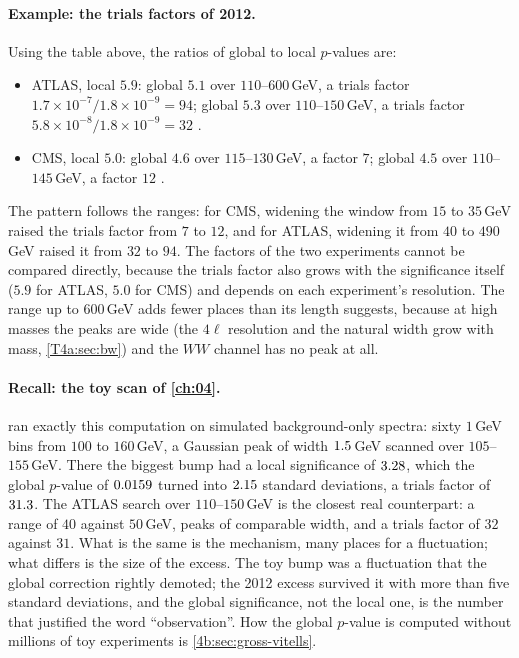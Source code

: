 \paragraph{Example: the trials factors of 2012.}
Using the table above, the ratios of global to local $p$-values are:
\begin{itemize}[itemsep=1pt,leftmargin=1.2em]
  \item ATLAS, local $5.9$: global $5.1$ over $110$--$600$\,GeV, a trials factor $1.7\times10^{-7}/1.8\times10^{-9}=94$; global $5.3$ over $110$--$150$\,GeV, a trials factor $5.8\times10^{-8}/1.8\times10^{-9}=32$ \cite[Sec.~9.2]{AadHiggs2012}.
  \item CMS, local $5.0$: global $4.6$ over $115$--$130$\,GeV, a factor $7$; global $4.5$ over $110$--$145$\,GeV, a factor $12$ \cite[Sec.~7.1]{ChatrchyanHiggs2012}.
\end{itemize}
The pattern follows the ranges: for CMS, widening the window from $15$ to $35$\,GeV raised the trials factor from $7$ to $12$, and for ATLAS, widening it from $40$ to $490$\,GeV raised it from $32$ to $94$. The factors of the two experiments cannot be compared directly, because the trials factor also grows with the significance itself ($5.9$ for ATLAS, $5.0$ for CMS) and depends on each experiment's resolution. The range up to $600$\,GeV adds fewer places than its length suggests, because at high masses the peaks are wide (the $4\ell$ resolution and the natural width grow with mass, \cref{T4a:sec:bw}) and the $WW$ channel has no peak at all.

\paragraph{Recall: the toy scan of \cref{ch:04}.}
 ran exactly this computation on simulated background-only spectra: sixty $1$\,GeV bins from $100$ to $160$\,GeV, a Gaussian peak of width $1.5$\,GeV scanned over $105$--$155$\,GeV. There the biggest bump had a local significance of $3.28$, which the global $p$-value of $0.0159$ turned into $2.15$ standard deviations, a trials factor of $31.3$. The ATLAS search over $110$--$150$\,GeV is the closest real counterpart: a range of $40$ against $50$\,GeV, peaks of comparable width, and a trials factor of $32$ against $31$. What is the same is the mechanism, many places for a fluctuation; what differs is the size of the excess. The toy bump was a fluctuation that the global correction rightly demoted; the 2012 excess survived it with more than five standard deviations, and the global significance, not the local one, is the number that justified the word ``observation''. How the global $p$-value is computed without millions of toy experiments is \cref{4b:sec:gross-vitells}.

